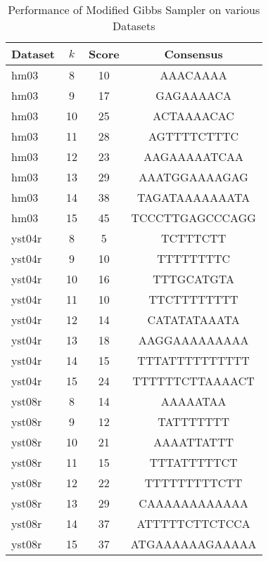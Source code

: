 \documentclass{report}
\begin{document}
\begin{table}[htbp]
\centering
\caption{Performance of Modified Gibbs Sampler on various Datasets}
\label{tab:modified-gibbs-summary}
\begin{tabular}{@{}lccc@{}}
\toprule
\textbf{Dataset} & \textbf{\(k\)} & \textbf{Score} & \textbf{Consensus} \\ \midrule
hm03 & 8 & 10 & AAACAAAA \\
hm03 & 9 & 17 & GAGAAAACA \\
hm03 & 10 & 25 & ACTAAAACAC \\
hm03 & 11 & 28 & AGTTTTCTTTC \\
hm03 & 12 & 23 & AAGAAAAATCAA \\
hm03 & 13 & 29 & AAATGGAAAAGAG \\
hm03 & 14 & 38 & TAGATAAAAAAATA \\
hm03 & 15 & 45 & TCCCTTGAGCCCAGG \\
yst04r & 8 & 5 & TCTTTCTT \\
yst04r & 9 & 10 & TTTTTTTTC \\
yst04r & 10 & 16 & TTTGCATGTA \\
yst04r & 11 & 10 & TTCTTTTTTTT \\
yst04r & 12 & 14 & CATATATAAATA \\
yst04r & 13 & 18 & AAGGAAAAAAAAA \\
yst04r & 14 & 15 & TTTATTTTTTTTTT \\
yst04r & 15 & 24 & TTTTTTCTTAAAACT \\
yst08r & 8 & 14 & AAAAATAA \\
yst08r & 9 & 12 & TATTTTTTT \\
yst08r & 10 & 21 & AAAATTATTT \\
yst08r & 11 & 15 & TTTATTTTTCT \\
yst08r & 12 & 22 & TTTTTTTTTCTT \\
yst08r & 13 & 29 & CAAAAAAAAAAAA \\
yst08r & 14 & 37 & ATTTTTCTTCTCCA \\
yst08r & 15 & 37 & ATGAAAAAAGAAAAA \\
\bottomrule
\end{tabular}
\end{table}
\end{document}
